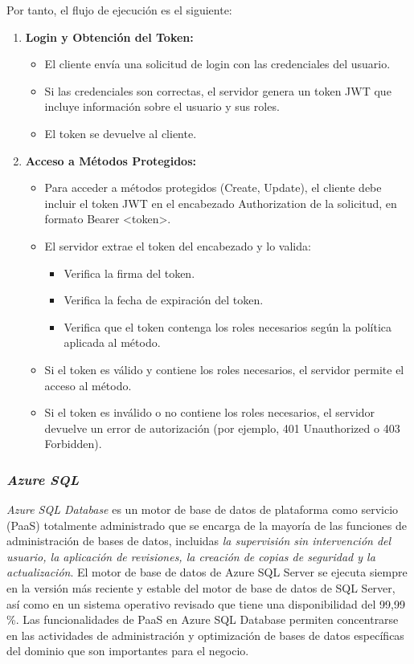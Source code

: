 Por tanto, el flujo de ejecución es el siguiente:
\begin{enumerate}
    \item \textbf{Login y Obtención del Token:}
    \begin{itemize}
        \item El cliente envía una solicitud de login con las credenciales del usuario.
        \item Si las credenciales son correctas, el servidor genera un token JWT que incluye información sobre el usuario y sus roles.
        \item El token se devuelve al cliente.
    \end{itemize}
    \item \textbf{Acceso a Métodos Protegidos:}
    \begin{itemize}
        \item Para acceder a métodos protegidos (Create, Update), el cliente debe incluir el token JWT en el encabezado Authorization de la solicitud, en formato Bearer <token>.
        \item El servidor extrae el token del encabezado y lo valida:
        \begin{itemize}
            \item Verifica la firma del token.
            \item Verifica la fecha de expiración del token.
            \item Verifica que el token contenga los roles necesarios según la política aplicada al método.
        \end{itemize}
        
        \item Si el token es válido y contiene los roles necesarios, el servidor permite el acceso al método.
        \item Si el token es inválido o no contiene los roles necesarios, el servidor devuelve un error de autorización (por ejemplo, 401 Unauthorized o 403 Forbidden).
    \end{itemize}
\end{enumerate}


\subsubsection{\textit{Azure SQL}}
\cite{AzureSQL}
\textit{Azure SQL Database} es un motor de base de datos de plataforma como servicio
(PaaS) totalmente administrado que se encarga de la mayoría de las funciones de
administración de bases de datos, incluidas \textit{la supervisión sin intervención del
usuario, la aplicación de revisiones, la creación de copias de seguridad y la
actualización}. El motor de base de datos de Azure SQL Server se ejecuta siempre
en la versión más reciente y estable del motor de base de datos de SQL Server,
así como en un sistema operativo revisado que tiene una disponibilidad del 99,99
\%. Las funcionalidades de PaaS en Azure SQL Database permiten concentrarse en
las actividades de administración y optimización de bases de datos específicas
del dominio que son importantes para el negocio.\\

